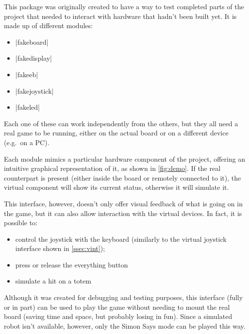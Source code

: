 \beforelist* This package was originally created to have a way to test completed
parts of the project that needed to interact with hardware that hadn't been
built yet.
It is made up of different modules:
\begin{multicols}{2}
\begin{itemize}
  \item \Code|fakeboard|
  \item \Code|fakedisplay|
  \item \Code|fakeeb|
  \item \Code|fakejoystick|
  \item \Code|fakeled|
\end{itemize}
\end{multicols}
\afterlist
Each one of these can work independently from the others, but they all need a
real game to be running, either on the actual board or on a different device
(e.g.\ on a PC).

Each module mimics a particular hardware component of the project, offering an
intuitive graphical representation of it, as shown in \autoref{fig:demo}. If the
real counterpart is present (either inside the board or remotely connected to
it), the virtual component will show its current status, otherwise it will
simulate it.

\beforelist* This interface, however, doesn't only offer visual feedback of what
is going on in the game, but it can also allow interaction with the virtual
devices.
In fact, it is possible to:
\begin{itemize}
  \item control the joystick with the keyboard (similarly to the virtual
    joystick interface shown in \autoref{ssec:vint});
  \item press or release the everything button
  \item simulate a hit on a totem
\end{itemize}
\afterlist*
Although it was created for debugging and testing purposes, this interface
(fully or in part) can be used to play the game without needing to mount the
real board (saving time and space, but probably losing in fun).
Since a simulated robot isn't available, however, only the Simon Says mode can
be played this way.

